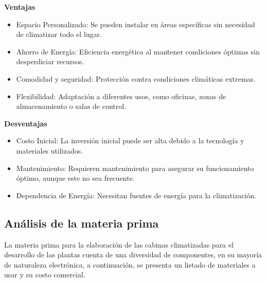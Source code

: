 \textbf{Ventajas}
\begin{itemize}
    \item Espacio Personalizado: Se pueden instalar en áreas específicas sin necesidad de climatizar todo el lugar.
    \item Ahorro de Energía: Eficiencia energética al mantener condiciones óptimas sin desperdiciar recursos.
    \item Comodidad y seguridad: Protección contra condiciones climáticas extremas.
    \item Flexibilidad: Adaptación a diferentes usos, como oficinas, zonas de almacenamiento o salas de control.
\end{itemize}

\textbf{Desventajas}
\begin{itemize}
    \item Costo Inicial: La inversión inicial puede ser alta debido a la tecnología y materiales utilizados.
    \item Mantenimiento: Requieren mantenimiento para asegurar su funcionamiento óptimo, aunque este no sea frecuente.
    \item Dependencia de Energía: Necesitan fuentes de energía para la climatización.
\end{itemize}

\subsection{Análisis de la materia prima }
La materia prima para la elaboración de las cabinas climatizadas para el desarrollo de las plantas cuenta de una diversidad de componentes, en su mayoría de naturaleza electrónica, a continuación, se presenta un listado de materiales a usar y su costo comercial. 

